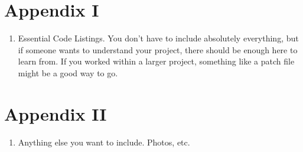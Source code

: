 \documentclass[12pt]{article}
\begin{document}
\section{Appendix I}
\begin{enumerate}
	\item Essential Code Listings. You don't have to include absolutely everything, but if someone wants to understand your project, there should be enough here to learn from. If you worked within a larger project, something like a patch file might be a good way to go. 
\end{enumerate}

\section{Appendix II}
\begin{enumerate}
	\item Anything else you want to include. Photos, etc. 
\end{enumerate}
\end{document}
